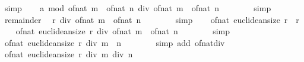 \begin{isabellebody}
\ simp\isanewline
\ \ \isamarkupfalse%
\ {\isachardoublequoteopen}a\ mod\ {\isacharparenleft}{\kern0pt}of{\isacharunderscore}{\kern0pt}nat\ m\ {\isacharasterisk}{\kern0pt}\ of{\isacharunderscore}{\kern0pt}nat\ n{\isacharparenright}{\kern0pt}\ div\ {\isacharparenleft}{\kern0pt}of{\isacharunderscore}{\kern0pt}nat\ m\ {\isacharasterisk}{\kern0pt}\ of{\isacharunderscore}{\kern0pt}nat\ n{\isacharparenright}{\kern0pt}\ {\isacharequal}{\kern0pt}\ {}{\isachardoublequoteclose}\isanewline
\ \ \ \ \isamarkupfalse%
\ simp\isanewline
\ \ \isamarkupfalse%
\ remainder{\isacharparenleft}{\kern0pt}{}{\isacharparenright}{\kern0pt}\ \isamarkupfalse%
\ {\isachardoublequoteopen}r\ div\ {\isacharparenleft}{\kern0pt}of{\isacharunderscore}{\kern0pt}nat\ m\ {\isacharasterisk}{\kern0pt}\ of{\isacharunderscore}{\kern0pt}nat\ n{\isacharparenright}{\kern0pt}\ {\isacharequal}{\kern0pt}\ {}{\isachardoublequoteclose}\isanewline
\ \ \ \ \isamarkupfalse%
\ simp\isanewline
\ \ \isamarkupfalse%
\ {\isacartoucheopen}of{\isacharunderscore}{\kern0pt}nat\ {\isacharparenleft}{\kern0pt}euclidean{\isacharunderscore}{\kern0pt}size\ r{\isacharparenright}{\kern0pt}\ {\isacharequal}{\kern0pt}\ r{\isacartoucheclose}\isanewline
\ \ \isamarkupfalse%
\ {\isachardoublequoteopen}of{\isacharunderscore}{\kern0pt}nat\ {\isacharparenleft}{\kern0pt}euclidean{\isacharunderscore}{\kern0pt}size\ r{\isacharparenright}{\kern0pt}\ div\ {\isacharparenleft}{\kern0pt}of{\isacharunderscore}{\kern0pt}nat\ m\ {\isacharasterisk}{\kern0pt}\ of{\isacharunderscore}{\kern0pt}nat\ n{\isacharparenright}{\kern0pt}\ {\isacharequal}{\kern0pt}\ {}{\isachardoublequoteclose}\isanewline
\ \ \ \ \isamarkupfalse%
\ simp\isanewline
\ \ \isamarkupfalse%
\ \isamarkupfalse%
\ {\isachardoublequoteopen}of{\isacharunderscore}{\kern0pt}nat\ {\isacharparenleft}{\kern0pt}euclidean{\isacharunderscore}{\kern0pt}size\ r\ div\ {\isacharparenleft}{\kern0pt}m\ {\isacharasterisk}{\kern0pt}\ n{\isacharparenright}{\kern0pt}{\isacharparenright}{\kern0pt}\ {\isacharequal}{\kern0pt}\ {}{\isachardoublequoteclose}\isanewline
\ \ \ \ \isamarkupfalse%
\ {\isacharparenleft}{\kern0pt}simp\ add{\isacharcolon}{\kern0pt}\ of{\isacharunderscore}{\kern0pt}nat{\isacharunderscore}{\kern0pt}div{\isacharparenright}{\kern0pt}\isanewline
\ \ \isamarkupfalse%
\ \isamarkupfalse%
\ {\isachardoublequoteopen}of{\isacharunderscore}{\kern0pt}nat\ {\isacharparenleft}{\kern0pt}euclidean{\isacharunderscore}{\kern0pt}size\ r\ div\ m\ div\ n{\isacharparenright}{\kern0pt}\ {\isacharequal}{\kern0pt}\ {}{\isachardoublequoteclose}\isanewline

\end{isabellebody}

